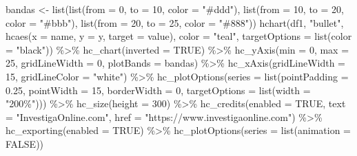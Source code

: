\documentclass[
]{book}
\newenvironment{Shaded}{\begin{snugshade}}{\end{snugshade}}
\newcommand{\AttributeTok}[1]{\textcolor[rgb]{0.77,0.63,0.00}{#1}}
\newcommand{\ConstantTok}[1]{\textcolor[rgb]{0.00,0.00,0.00}{#1}}
\newcommand{\DecValTok}[1]{\textcolor[rgb]{0.00,0.00,0.81}{#1}}
\newcommand{\FloatTok}[1]{\textcolor[rgb]{0.00,0.00,0.81}{#1}}
\newcommand{\FunctionTok}[1]{\textcolor[rgb]{0.00,0.00,0.00}{#1}}
\newcommand{\NormalTok}[1]{#1}
\newcommand{\OtherTok}[1]{\textcolor[rgb]{0.56,0.35,0.01}{#1}}
\newcommand{\SpecialCharTok}[1]{\textcolor[rgb]{0.00,0.00,0.00}{#1}}
\newcommand{\StringTok}[1]{\textcolor[rgb]{0.31,0.60,0.02}{#1}}
\begin{document}
\begin{Shaded}
\begin{Highlighting}[]
\NormalTok{bandas }\OtherTok{\textless{}{-}} \FunctionTok{list}\NormalTok{(}\FunctionTok{list}\NormalTok{(}\AttributeTok{from =} \DecValTok{0}\NormalTok{, }\AttributeTok{to =} \DecValTok{10}\NormalTok{, }\AttributeTok{color =} \StringTok{"\#ddd"}\NormalTok{), }\FunctionTok{list}\NormalTok{(}\AttributeTok{from =} \DecValTok{10}\NormalTok{,}
  \AttributeTok{to =} \DecValTok{20}\NormalTok{, }\AttributeTok{color =} \StringTok{"\#bbb"}\NormalTok{), }\FunctionTok{list}\NormalTok{(}\AttributeTok{from =} \DecValTok{20}\NormalTok{, }\AttributeTok{to =} \DecValTok{25}\NormalTok{, }\AttributeTok{color =} \StringTok{"\#888"}\NormalTok{))}
\FunctionTok{hchart}\NormalTok{(df1, }\StringTok{"bullet"}\NormalTok{, }\FunctionTok{hcaes}\NormalTok{(}\AttributeTok{x =}\NormalTok{ name, }\AttributeTok{y =}\NormalTok{ y, }\AttributeTok{target =}\NormalTok{ value),}
  \AttributeTok{color =} \StringTok{"teal"}\NormalTok{, }\AttributeTok{targetOptions =} \FunctionTok{list}\NormalTok{(}\AttributeTok{color =} \StringTok{"black"}\NormalTok{)) }\SpecialCharTok{\%\textgreater{}\%}
  \FunctionTok{hc\_chart}\NormalTok{(}\AttributeTok{inverted =} \ConstantTok{TRUE}\NormalTok{) }\SpecialCharTok{\%\textgreater{}\%}
  \FunctionTok{hc\_yAxis}\NormalTok{(}\AttributeTok{min =} \DecValTok{0}\NormalTok{, }\AttributeTok{max =} \DecValTok{25}\NormalTok{, }\AttributeTok{gridLineWidth =} \DecValTok{0}\NormalTok{, }\AttributeTok{plotBands =}\NormalTok{ bandas) }\SpecialCharTok{\%\textgreater{}\%}
  \FunctionTok{hc\_xAxis}\NormalTok{(}\AttributeTok{gridLineWidth =} \DecValTok{15}\NormalTok{, }\AttributeTok{gridLineColor =} \StringTok{"white"}\NormalTok{) }\SpecialCharTok{\%\textgreater{}\%}
  \FunctionTok{hc\_plotOptions}\NormalTok{(}\AttributeTok{series =} \FunctionTok{list}\NormalTok{(}\AttributeTok{pointPadding =} \FloatTok{0.25}\NormalTok{, }\AttributeTok{pointWidth =} \DecValTok{15}\NormalTok{,}
    \AttributeTok{borderWidth =} \DecValTok{0}\NormalTok{, }\AttributeTok{targetOptions =} \FunctionTok{list}\NormalTok{(}\AttributeTok{width =} \StringTok{"200\%"}\NormalTok{))) }\SpecialCharTok{\%\textgreater{}\%}
  \FunctionTok{hc\_size}\NormalTok{(}\AttributeTok{height =} \DecValTok{300}\NormalTok{) }\SpecialCharTok{\%\textgreater{}\%}
  \FunctionTok{hc\_credits}\NormalTok{(}\AttributeTok{enabled =} \ConstantTok{TRUE}\NormalTok{, }\AttributeTok{text =} \StringTok{"InvestigaOnline.com"}\NormalTok{,}
    \AttributeTok{href =} \StringTok{"https://www.investigaonline.com"}\NormalTok{) }\SpecialCharTok{\%\textgreater{}\%}
  \FunctionTok{hc\_exporting}\NormalTok{(}\AttributeTok{enabled =} \ConstantTok{TRUE}\NormalTok{) }\SpecialCharTok{\%\textgreater{}\%}
  \FunctionTok{hc\_plotOptions}\NormalTok{(}\AttributeTok{series =} \FunctionTok{list}\NormalTok{(}\AttributeTok{animation =} \ConstantTok{FALSE}\NormalTok{))}
\end{Highlighting}
\end{Shaded}
\end{document}

